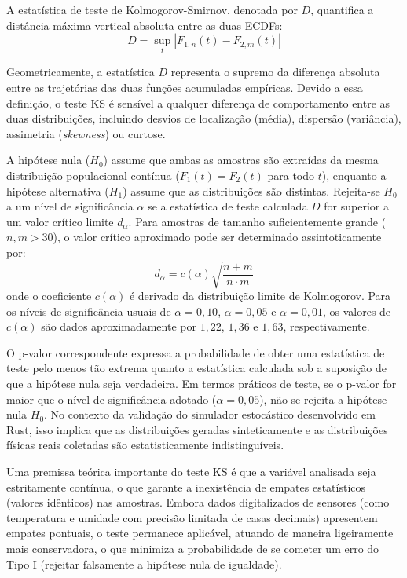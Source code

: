 \documentclass[
	12pt,
	openright,
	oneside,
	a4paper,
	english,
	brazil
	]{abntex2}
\begin{document}
A estatística de teste de Kolmogorov-Smirnov, denotada por $D$, quantifica a distância máxima vertical absoluta entre as duas ECDFs:
\begin{equation}
D = \sup_t |F_{1,n}(t) - F_{2,m}(t)|
\end{equation}

Geometricamente, a estatística $D$ representa o supremo da diferença absoluta entre as trajetórias das duas funções acumuladas empíricas. Devido a essa definição, o teste KS é sensível a qualquer diferença de comportamento entre as duas distribuições, incluindo desvios de localização (média), dispersão (variância), assimetria (\textit{skewness}) ou curtose.

A hipótese nula ($H_0$) assume que ambas as amostras são extraídas da mesma distribuição populacional contínua ($F_1(t) = F_2(t)$ para todo $t$), enquanto a hipótese alternativa ($H_1$) assume que as distribuições são distintas. Rejeita-se $H_0$ a um nível de significância $\alpha$ se a estatística de teste calculada $D$ for superior a um valor crítico limite $d_{\alpha}$. Para amostras de tamanho suficientemente grande ($n, m > 30$), o valor crítico aproximado pode ser determinado assintoticamente por:
\begin{equation}
d_{\alpha} = c(\alpha) \sqrt{\frac{n + m}{n \cdot m}}
\end{equation}
onde o coeficiente $c(\alpha)$ é derivado da distribuição limite de Kolmogorov. Para os níveis de significância usuais de $\alpha = 0,10$, $\alpha = 0,05$ e $\alpha = 0,01$, os valores de $c(\alpha)$ são dados aproximadamente por $1,22$, $1,36$ e $1,63$, respectivamente.

O p-valor correspondente expressa a probabilidade de obter uma estatística de teste pelo menos tão extrema quanto a estatística calculada sob a suposição de que a hipótese nula seja verdadeira. Em termos práticos de teste, se o p-valor for maior que o nível de significância adotado ($\alpha = 0,05$), não se rejeita a hipótese nula $H_0$. No contexto da validação do simulador estocástico desenvolvido em Rust, isso implica que as distribuições geradas sinteticamente e as distribuições físicas reais coletadas são estatisticamente indistinguíveis.

Uma premissa teórica importante do teste KS é que a variável analisada seja estritamente contínua, o que garante a inexistência de empates estatísticos (valores idênticos) nas amostras. Embora dados digitalizados de sensores (como temperatura e umidade com precisão limitada de casas decimais) apresentem empates pontuais, o teste permanece aplicável, atuando de maneira ligeiramente mais conservadora, o que minimiza a probabilidade de se cometer um erro do Tipo I (rejeitar falsamente a hipótese nula de igualdade).
\end{document}
